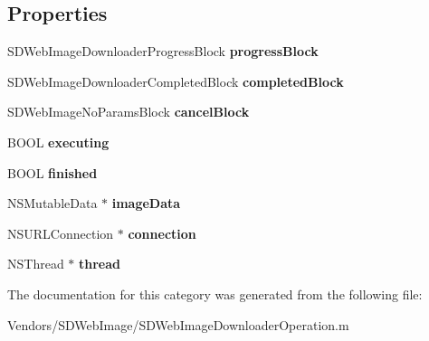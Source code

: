 \subsection*{Properties}
\begin{DoxyCompactItemize}
\item 
\hypertarget{category_s_d_web_image_downloader_operation_07_08_a5a11edcffddb0b1ab8e73acf84e2e119}{}S\+D\+Web\+Image\+Downloader\+Progress\+Block {\bfseries progress\+Block}\label{category_s_d_web_image_downloader_operation_07_08_a5a11edcffddb0b1ab8e73acf84e2e119}

\item 
\hypertarget{category_s_d_web_image_downloader_operation_07_08_a79d749d78b081a251afff0fef2fe002d}{}S\+D\+Web\+Image\+Downloader\+Completed\+Block {\bfseries completed\+Block}\label{category_s_d_web_image_downloader_operation_07_08_a79d749d78b081a251afff0fef2fe002d}

\item 
\hypertarget{category_s_d_web_image_downloader_operation_07_08_adc377b055d23f796fa74f8c4a4c3268f}{}S\+D\+Web\+Image\+No\+Params\+Block {\bfseries cancel\+Block}\label{category_s_d_web_image_downloader_operation_07_08_adc377b055d23f796fa74f8c4a4c3268f}

\item 
\hypertarget{category_s_d_web_image_downloader_operation_07_08_a2728a4f37b9c84db6e13d172e3e64d3a}{}B\+O\+O\+L {\bfseries executing}\label{category_s_d_web_image_downloader_operation_07_08_a2728a4f37b9c84db6e13d172e3e64d3a}

\item 
\hypertarget{category_s_d_web_image_downloader_operation_07_08_a0ec2440fa7ec97890db2250ade7e5f15}{}B\+O\+O\+L {\bfseries finished}\label{category_s_d_web_image_downloader_operation_07_08_a0ec2440fa7ec97890db2250ade7e5f15}

\item 
\hypertarget{category_s_d_web_image_downloader_operation_07_08_a8ff2ab0970f466ec203f53b3e868c355}{}N\+S\+Mutable\+Data $\ast$ {\bfseries image\+Data}\label{category_s_d_web_image_downloader_operation_07_08_a8ff2ab0970f466ec203f53b3e868c355}

\item 
\hypertarget{category_s_d_web_image_downloader_operation_07_08_aecbc22ceed56acd75edeb8d9f18d50a7}{}N\+S\+U\+R\+L\+Connection $\ast$ {\bfseries connection}\label{category_s_d_web_image_downloader_operation_07_08_aecbc22ceed56acd75edeb8d9f18d50a7}

\item 
\hypertarget{category_s_d_web_image_downloader_operation_07_08_a1ff5be79d7b8383baf092f284c92412a}{}N\+S\+Thread $\ast$ {\bfseries thread}\label{category_s_d_web_image_downloader_operation_07_08_a1ff5be79d7b8383baf092f284c92412a}

\end{DoxyCompactItemize}


The documentation for this category was generated from the following file\+:\begin{DoxyCompactItemize}
\item 
Vendors/\+S\+D\+Web\+Image/S\+D\+Web\+Image\+Downloader\+Operation.\+m\end{DoxyCompactItemize}
